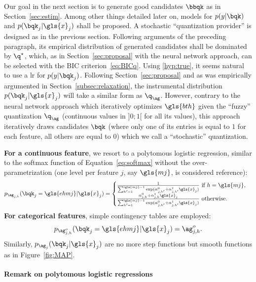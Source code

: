 Our goal in the next section is to generate good candidates $\bbqk$ as in Section~\ref{sec:estim}. Among other things detailed later on, models for $p(y | \bqk)$ and $p(\bqk_j | \gls{x}_j)$ shall be proposed. 
A stochastic ``quantization provider'' is designed as in the previous section. Following arguments of the preceding paragraph, its empirical distribution of generated candidates shall be dominated by $\q^\star$,
which, as in Section~\ref{sec:proposal} with the neural network approach, can be selected with the BIC criterion~\eqref{eq:BICq}. Using \eqref{hyp:true}, it seems natural to use a \gls{lr} for $p( y | \bqk_j)$. Following Section~\ref{sec:proposal} and as was empirically argumented in Section~\ref{subsec:relaxation}, the instrumental distribution $p(\bqk_j | \gls{x}_j)$ will take a similar form as $\q_{\ag}$. However, contrary to the neural network approach which iteratively optimizes $\gls{bth}$ given the ``fuzzy'' quantization $\q_{\ag}$ (continuous values in $]0;1[$ for all its values), this approach iteratively draws candidates $\bqk$ (where only one of its entries is equal to $1$ for each feature, all others are equal to $0$) which we call a ``stochastic'' quantization.

{\bf For a continuous feature}, we resort to a polytomous logistic regression, similar to the softmax function of Equation~\eqref{eq:softmax} without the over-parametrization (one level per feature $j$, say $\gls{mj}$, is considered reference):
\[ p_{\ag_{j,h}}(\bqk_j = \gls{ehmj} | \gls{x}_j) = \begin{cases} \frac{1}{\sum_{h'=1}^{\gls{mj}-1} \exp(\alpha_{j,h'}^0 + \alpha_{j,h'}^1 \gls{x}_j)} \text{ if } h = \gls{mj}, \\ \frac{\alpha_{j,h}^0 + \alpha_{j,h}^1 \gls{x}_j}{\sum_{h'=1}^{\gls{mj}-1} \exp(\alpha_{j,h'}^0 + \alpha_{j,h'}^1 \gls{x}_j)} \text{ otherwise.} \end{cases} \]
{\bf For categorical features}, simple contingency tables are employed:
\[ p_{\ag_{j,h}^o}(\bqk_j = \gls{ehmj} | \gls{x}_j) = \ag_{j,h}^o. \]
Similarly, $p_{\ag_j}(\bqk_j | \gls{x}_j)$ are no more step functions but smooth functions as in Figure~\ref{fig:MAP}.

\paragraph{Remark on polytomous logistic regressions}

